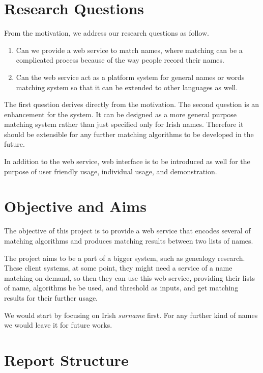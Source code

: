 \section{Research Questions}
\label{sec:rq}

From the motivation, we address our research questions as follow.

\begin{enumerate}
  \item Can we provide a web service to match names, where matching can be
    a complicated process because of the way people record their names.
  \item Can the web service act as a platform system for general names or words
    matching system so that it can be extended to other languages as well.
\end{enumerate}

The first question derives directly from the motivation.
The second question is an enhancement for the system. It can be designed
as a more general purpose matching system rather than just specified
only for Irish names. Therefore it should be extensible for any further
matching algorithms to be developed in the future.

In addition to the web service, web interface is to be introduced as well
for the purpose of user friendly usage, individual usage, and demonstration.

\section{Objective and Aims}
\label{sec:obj}

The objective of this project is to provide a web service that
encodes several of matching algorithms and produces matching
results between two lists of names.

The project aims to be a part of a bigger system, such as
genealogy research. These client systems, at some point,
they might need a service of a name matching on demand, so then they can use this
web service, providing their lists of name, algorithms be be used,
and threshold as inputs, and get matching results for their further usage.

We would start by focusing on Irish \textit{surname} first.
For any further kind of names we would leave it for future works.

\section{Report Structure}

